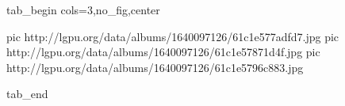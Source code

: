  
 
 
 
 


\ifcmt
  tab_begin cols=3,no_fig,center

     pic http://lgpu.org/data/albums/1640097126/61c1e577adfd7.jpg
		 pic http://lgpu.org/data/albums/1640097126/61c1e57871d4f.jpg
		 pic http://lgpu.org/data/albums/1640097126/61c1e5796c883.jpg

  tab_end
\fi
